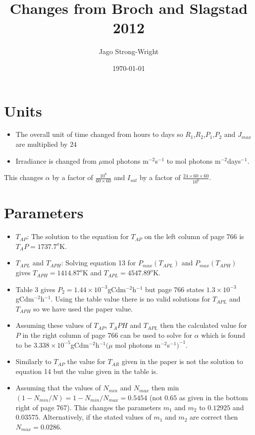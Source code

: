 \documentclass{article}
\title{Changes from Broch and Slagstad 2012}
\date{\today}
\author{Jago Strong-Wright}
\begin{document}
\maketitle
\section*{Units}
\begin{itemize}
    \item The overall unit of time changed from hours to days so $R_1$,$R_2$,$P_1$,$P_2$ and $J_{max}$ are multiplied by $24$
    \item Irradiance is changed from $\mu$mol photons m$^{-2}$s$^{-1}$ to mol photons m$^{-2}$days$^{-1}$.
\end{itemize}
This changes $\alpha$ by a factor of $\frac{10^6}{60\times60}$ and $I_{sat}$ by a factor of $\frac{24\times60\times60}{10^6}$.

\section*{Parameters}
\begin{itemize}
    \item $T_{AP}$: The solution to the equation for $T_{AP}$ on the left column of page 766 is $T_AP=1737.7^o$K.
    \item $T_{APL}$ and $T_{APH}$: Solving equation 13 for $P_{max}(T_{APL})$ and $P_{max}(T_{APH})$ gives $T_{APH}=1414.87^o$K and $T_{APL} = 4547.89^o$K.
    \item Table 3 gives $P_2=1.44\times10^{-3}$gCdm$^{-2}$h$^{-1}$ but page 766 states $1.3\times10^{-3}$gCdm$^{-2}$h$^{-1}$. Using the table value there is no valid solutions for $T_{APL}$ and $T_{APH}$ so we have used the paper value.
    \item Assuming these values of $T_{AP}$, $T_APH$ and $T_{APL}$ then the calculated value for $P$ in the right column of page 766 can be used to solve for $\alpha$ which is found to be $3.338\times10^{-5}$gCdm$^{-2}$h$^{-1}(\mu$ mol photons m$^{-2}$s$^{-1})^{-1}$.
    \item Similarly to $T_{AP}$ the value for $T_{AR}$ given in the paper is not the solution to equation 14 but the value given in the table is.
    \item Assuming that the values of $N_{min}$ and $N_{max}$ then min$(1-N_{min}/N)=1-N_{min}/N_{max}=0.5454$ (not $0.65$ as given in the bottom right of page 767). This changes the parameters $m_1$ and $m_2$ to $0.12925$ and $0.03575$. Alternatively, if the stated values of $m_1$ and $m_2$ are correct then $N_{max}=0.0286$.
\end{itemize}
\end{document}
